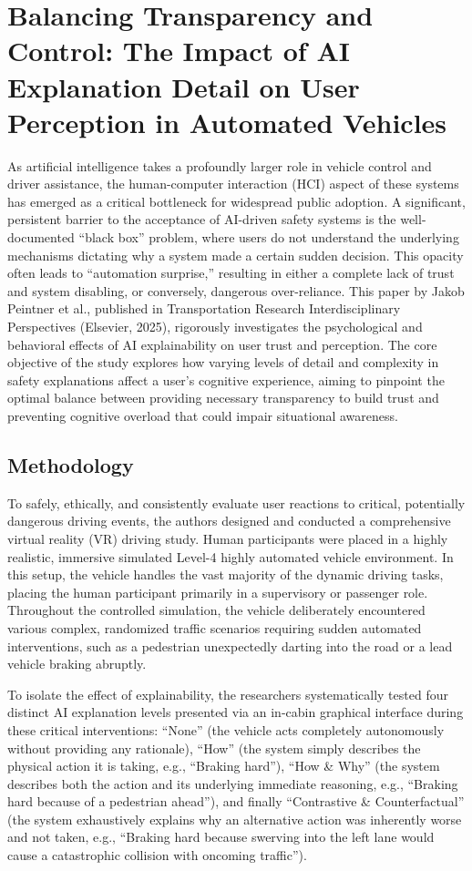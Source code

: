 \section{Balancing Transparency and Control: The Impact of AI Explanation Detail on User Perception in Automated Vehicles}

As artificial intelligence takes a profoundly larger role in vehicle control and driver assistance, the human-computer interaction (HCI) aspect of these systems has emerged as a critical bottleneck for widespread public adoption. A significant, persistent barrier to the acceptance of AI-driven safety systems is the well-documented ``black box'' problem, where users do not understand the underlying mechanisms dictating why a system made a certain sudden decision. This opacity often leads to ``automation surprise,'' resulting in either a complete lack of trust and system disabling, or conversely, dangerous over-reliance. This paper by Jakob Peintner et al., published in Transportation Research Interdisciplinary Perspectives (Elsevier, 2025), rigorously investigates the psychological and behavioral effects of AI explainability on user trust and perception. The core objective of the study explores how varying levels of detail and complexity in safety explanations affect a user's cognitive experience, aiming to pinpoint the optimal balance between providing necessary transparency to build trust and preventing cognitive overload that could impair situational awareness.

\subsection{Methodology}
To safely, ethically, and consistently evaluate user reactions to critical, potentially dangerous driving events, the authors designed and conducted a comprehensive virtual reality (VR) driving study. Human participants were placed in a highly realistic, immersive simulated Level-4 highly automated vehicle environment. In this setup, the vehicle handles the vast majority of the dynamic driving tasks, placing the human participant primarily in a supervisory or passenger role. Throughout the controlled simulation, the vehicle deliberately encountered various complex, randomized traffic scenarios requiring sudden automated interventions, such as a pedestrian unexpectedly darting into the road or a lead vehicle braking abruptly.

To isolate the effect of explainability, the researchers systematically tested four distinct AI explanation levels presented via an in-cabin graphical interface during these critical interventions: ``None'' (the vehicle acts completely autonomously without providing any rationale), ``How'' (the system simply describes the physical action it is taking, e.g., ``Braking hard''), ``How \& Why'' (the system describes both the action and its underlying immediate reasoning, e.g., ``Braking hard because of a pedestrian ahead''), and finally ``Contrastive \& Counterfactual'' (the system exhaustively explains why an alternative action was inherently worse and not taken, e.g., ``Braking hard because swerving into the left lane would cause a catastrophic collision with oncoming traffic''). 

